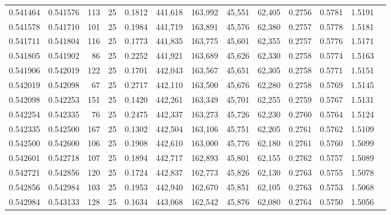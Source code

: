 \begin{tabular}{rrrrrrrrrrrrr}
0.541464 & 0.541576 &   113 &  25 &                                     0.1812 & 441,618 & 163,992 &  45,551 &  62,405 & 0.2756 & 0.5781 & 1.5191 \\
0.541578 & 0.541710 &   101 &  25 &                                     0.1984 & 441,719 & 163,891 &  45,576 &  62,380 & 0.2757 & 0.5778 & 1.5181 \\
0.541711 & 0.541804 &   116 &  25 &                                     0.1773 & 441,835 & 163,775 &  45,601 &  62,355 & 0.2757 & 0.5776 & 1.5171 \\
0.541805 & 0.541902 &    86 &  25 &                                     0.2252 & 441,921 & 163,689 &  45,626 &  62,330 & 0.2758 & 0.5774 & 1.5163 \\
0.541906 & 0.542019 &   122 &  25 &                                     0.1701 & 442,043 & 163,567 &  45,651 &  62,305 & 0.2758 & 0.5771 & 1.5151 \\
0.542019 & 0.542098 &    67 &  25 &                                     0.2717 & 442,110 & 163,500 &  45,676 &  62,280 & 0.2758 & 0.5769 & 1.5145 \\
0.542098 & 0.542253 &   151 &  25 &                                     0.1420 & 442,261 & 163,349 &  45,701 &  62,255 & 0.2759 & 0.5767 & 1.5131 \\
0.542254 & 0.542335 &    76 &  25 &                                     0.2475 & 442,337 & 163,273 &  45,726 &  62,230 & 0.2760 & 0.5764 & 1.5124 \\
0.542335 & 0.542500 &   167 &  25 &                                     0.1302 & 442,504 & 163,106 &  45,751 &  62,205 & 0.2761 & 0.5762 & 1.5109 \\
0.542500 & 0.542600 &   106 &  25 &                                     0.1908 & 442,610 & 163,000 &  45,776 &  62,180 & 0.2761 & 0.5760 & 1.5099 \\
0.542601 & 0.542718 &   107 &  25 &                                     0.1894 & 442,717 & 162,893 &  45,801 &  62,155 & 0.2762 & 0.5757 & 1.5089 \\
0.542721 & 0.542856 &   120 &  25 &                                     0.1724 & 442,837 & 162,773 &  45,826 &  62,130 & 0.2763 & 0.5755 & 1.5078 \\
0.542856 & 0.542984 &   103 &  25 &                                     0.1953 & 442,940 & 162,670 &  45,851 &  62,105 & 0.2763 & 0.5753 & 1.5068 \\
0.542984 & 0.543133 &   128 &  25 &                                     0.1634 & 443,068 & 162,542 &  45,876 &  62,080 & 0.2764 & 0.5750 & 1.5056 \\

\end{tabular}
